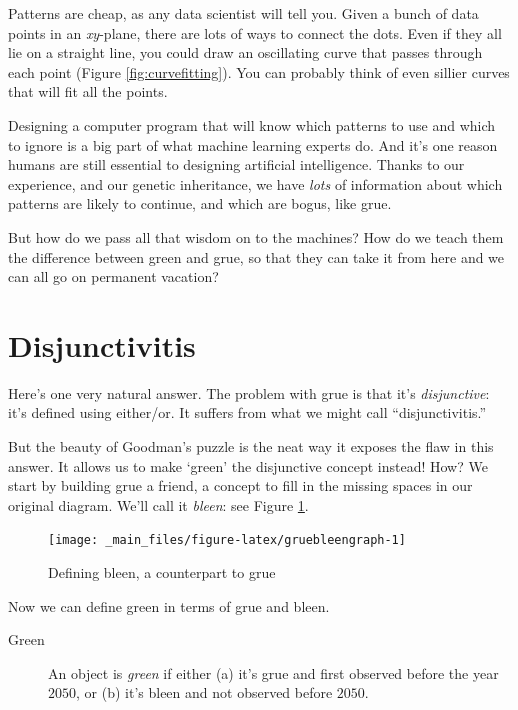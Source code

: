 \documentclass[justified]{tufte-book}
\theoremstyle{definition}
\theoremstyle{definition}
\theoremstyle{definition}
\theoremstyle{definition}
\theoremstyle{remark}
\begin{document}
Patterns are cheap, as any data scientist will tell you. Given a bunch of data points in an \emph{xy}-plane, there are lots of ways to connect the dots. Even if they all lie on a straight line, you could draw an oscillating curve that passes through each point (Figure \ref{fig:curvefitting}). You can probably think of even sillier curves that will fit all the points.

Designing a computer program that will know which patterns to use and which to ignore is a big part of what machine learning experts do. And it's one reason humans are still essential to designing artificial intelligence. Thanks to our experience, and our genetic inheritance, we have \emph{lots} of information about which patterns are likely to continue, and which are bogus, like grue.

But how do we pass all that wisdom on to the machines? How do we teach them the difference between green and grue, so that they can take it from here and we can all go on permanent vacation?

\hypertarget{disjunctivitis}{%
\section*{Disjunctivitis}\label{disjunctivitis}}

Here's one very natural answer. The problem with grue is that it's \emph{disjunctive}: it's defined using either/or. It suffers from what we might call ``disjunctivitis.''

But the beauty of Goodman's puzzle is the neat way it exposes the flaw in this answer. It allows us to make `green' the disjunctive concept instead! How? We start by building grue a friend, a concept to fill in the missing spaces in our original diagram. We'll call it \emph{bleen}: see Figure \ref{fig:gruebleengraph}.

\begin{figure}
\texttt{[image: \_main\_files/figure-latex/gruebleengraph-1]} \caption[Defining bleen, a counterpart to grue]{Defining bleen, a counterpart to grue}\label{fig:gruebleengraph}
\end{figure}

Now we can define green in terms of grue and bleen.

\begin{description}
\item[Green]
An object is \emph{green} if either (a) it's grue and first observed before the year \(2050\), or (b) it's bleen and not observed before \(2050\).
\end{description}
\end{document}

